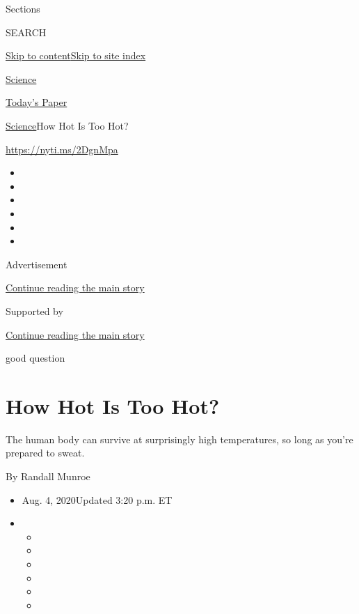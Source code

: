 Sections

SEARCH

\protect\hyperlink{site-content}{Skip to
content}\protect\hyperlink{site-index}{Skip to site index}

\href{https://www.nytimes.com/section/science}{Science}

\href{https://myaccount.nytimes.com/auth/login?response_type=cookie\&client_id=vi}{}

\href{https://www.nytimes.com/section/todayspaper}{Today's Paper}

\href{/section/science}{Science}\textbar{}How Hot Is Too Hot?

\url{https://nyti.ms/2DgnMpa}

\begin{itemize}
\item
\item
\item
\item
\item
\item
\end{itemize}

Advertisement

\protect\hyperlink{after-top}{Continue reading the main story}

Supported by

\protect\hyperlink{after-sponsor}{Continue reading the main story}

good question

\hypertarget{how-hot-is-too-hot}{%
\section{How Hot Is Too Hot?}\label{how-hot-is-too-hot}}

The human body can survive at surprisingly high temperatures, so long as
you're prepared to sweat.

By Randall Munroe

\begin{itemize}
\item
  Aug. 4, 2020Updated 3:20 p.m. ET
\item
  \begin{itemize}
  \item
  \item
  \item
  \item
  \item
  \item
  \end{itemize}
\end{itemize}

